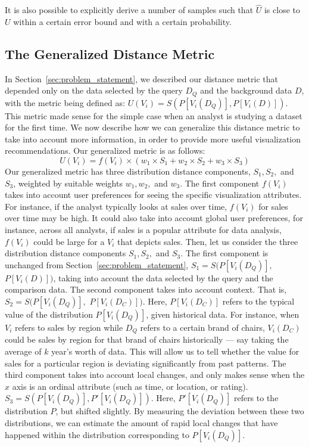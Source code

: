 It is also possible to explicitly derive a number of samples 
such that $\hat{U}$ is close to $U$ within a certain error bound
and with a certain probability. 




\subsection{The Generalized Distance Metric}\label{sec:general-metric}

In Section~\ref{sec:problem_statement}, we described our
distance metric that depended only on the data selected
by the query $D_Q$ and the background data $D$,
with the metric being defined as:
$ U (V_i) = S ( P[V_i (D_Q)], P[V_i (D)] )$.
This metric made sense for the simple case
when an analyst is studying a dataset for the first time.
We now describe how we can generalize this distance
metric to take into account more information,
in order to provide more useful visualization recommendations.
Our generalized metric is as follows:
$$ U (V_i) = f(V_i) \times (w_1\times S_1 + w_2 \times S_2 + w_3 \times S_3)$$
Our generalized metric has three distribution
distance components, $S_1, S_2,$ and $S_3$,
weighted by suitable weights $w_1, w_2,$ and $w_3$.
The first component $f(V_i)$ takes into
account user preferences for seeing the specific 
visualization attributes.
For instance, if the analyst typically looks at
sales over time, $f(V_i)$ for sales over time
may be high.
It could also take into account global user preferences,
for instance, across all analysts, if sales is a popular
attribute for data analysis, $f(V_i)$ could be large for
a $V_i$ that depicts sales.
Then, let us consider the three distribution distance
components $S_1, S_2,$ and $S_3$.
The first component is unchanged from Section~\ref{sec:problem_statement},
$S_1 = S ( P[V_i (D_Q)],$ $P[V_i (D)] )$,
taking into account the data selected by the query and
the comparison data.
The second component takes into account context.
That is, $S_2 = S ( P[V_i (D_Q)], $ $P[V_i (D_C)] )$.
Here, $P[V_i (D_C)]$ refers to the typical value of the distribution 
$P[V_i (D_Q)]$,
given historical data.
For instance, when $V_i$ refers to sales by
region while $D_Q$ refers to a certain brand of chairs,
$V_i(D_C)$ could be sales by region for that brand of chairs
historically --- say taking the average of $k$ year's worth of data.
This will allow us to tell whether the value for sales for a particular
region is deviating significantly from past patterns.
The third component takes into account local changes,
and only makes sense when the $x$ axis is an ordinal attribute
(such as time, or location, or rating).
$S_3 = S ( P[V_i (D_Q)], P'[V_i (D_Q)] )$.
Here, $P'[V_i (D_Q)]$ refers to the distribution $P$, but shifted slightly.
By measuring the deviation between these two distributions,
we can estimate the amount of rapid local changes that have happened
within the distribution corresponding to $P[V_i (D_Q)]$.

